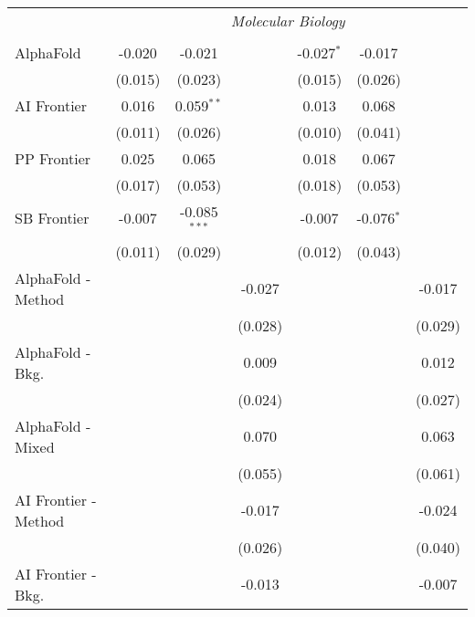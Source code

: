 \begin{tabular}{lcccccc}
 & \multicolumn{6}{c}{\textit{Molecular Biology}} \\ \\
   AlphaFold            & -0.020  & -0.021         &               & -0.027$^{*}$ & -0.017       &   \\   
                        & (0.015) & (0.023)        &               & (0.015)      & (0.026)      &   \\   
   AI Frontier          & 0.016   & 0.059$^{**}$   &               & 0.013        & 0.068        &   \\   
                        & (0.011) & (0.026)        &               & (0.010)      & (0.041)      &   \\   
   PP Frontier          & 0.025   & 0.065          &               & 0.018        & 0.067        &   \\   
                        & (0.017) & (0.053)        &               & (0.018)      & (0.053)      &   \\   
   SB Frontier          & -0.007  & -0.085$^{***}$ &               & -0.007       & -0.076$^{*}$ &   \\   
                        & (0.011) & (0.029)        &               & (0.012)      & (0.043)      &   \\   
   AlphaFold - Method   &         &                & -0.027        &              &              & -0.017\\   
                        &         &                & (0.028)       &              &              & (0.029)\\   
   AlphaFold - Bkg.     &         &                & 0.009         &              &              & 0.012\\   
                        &         &                & (0.024)       &              &              & (0.027)\\   
   AlphaFold - Mixed    &         &                & 0.070         &              &              & 0.063\\   
                        &         &                & (0.055)       &              &              & (0.061)\\   
   AI Frontier - Method &         &                & -0.017        &              &              & -0.024\\   
                        &         &                & (0.026)       &              &              & (0.040)\\   
   AI Frontier - Bkg.   &         &                & -0.013        &              &              & -0.007\\   

\end{tabular}

